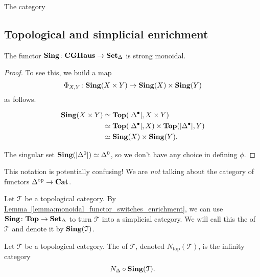 \documentclass[main.tex]{subfiles}
\begin{document}
\begin{theorem}
  The category
\end{theorem}

\subsection{Topological and simplicial enrichment}
\label{ssc:topological_and_simplicial_enrichment}

\begin{lemma}
  The functor $\mathbf{Sing}\colon \mathbf{CGHaus} \to \operatorname{\mathbf{Set}_{\Delta}}$ is strong monoidal.
\end{lemma}
\begin{proof}
  To see this, we build a map
  \begin{equation*}
    \Phi_{X, Y}\colon \mathbf{Sing}(X \times Y) \to \mathbf{Sing}(X) \times \mathbf{Sing}(Y)
  \end{equation*}
  as follows.

  \begin{align*}
    \mathbf{Sing}(X \times Y) &\simeq \mathbf{Top}({| \Delta^{\bullet} |}, X \times Y) \\
    &\simeq \mathbf{Top}({| \Delta^{\bullet} |}, X) \times \mathbf{Top}({| \Delta^{\bullet} |}, Y) \\
    &\simeq \mathbf{Sing}(X) \times \mathbf{Sing}(Y).
  \end{align*}

  The singular set $\mathbf{Sing}({| \Delta^{0} |}) \simeq \Delta^{0}$, so we don't have any choice in defining $\phi$.
\end{proof}



\begin{note}
  This notation is potentially confusing! We are \emph{not} talking about the category of functors $\Delta^{\mathrm{op}} \to \mathbf{Cat}$.
\end{note}

\begin{definition}
  \label{def:singular_nerve}
  Let $\mathcal{T}$ be a topological category. By \hyperref[lemma:monoidal_functor_switches_enrichment]{Lemma~\ref*{lemma:monoidal_functor_switches_enrichment}}, we can use $\mathbf{Sing}\colon \mathbf{Top} \to \operatorname{\mathbf{Set}_{\Delta}}$ to turn $\mathcal{T}$ into a simplicial category. We will call this the  of $\mathcal{T}$ and denote it by $\mathbf{Sing}(\mathcal{T})$.
\end{definition}

\begin{definition}
  \label{def:topological_nerve}
  Let $\mathcal{T}$ be a topological category. The  of $\mathcal{T}$, denoted $N_{\mathrm{top}}(\mathcal{T})$, is the infinity category
  \begin{equation*}
    N_{\Delta} \circ \mathbf{Sing}(\mathcal{T}).
  \end{equation*}
\end{definition}
\end{document}

